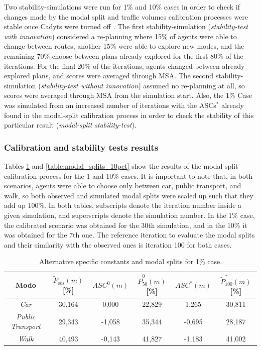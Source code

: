 \documentclass[Journal,letterpaper]{ascelike-new}
\begin{document}
Two stability-simulations were run for 1\% and 10\% cases in order to check if changes made by the modal split and traffic volumes calibration processes were stable once Cadyts were turned off . The first stability-simulation (\emph{stability-test with innovation}) considered a re-planning where 15\% of agents were able to change between routes, another 15\% were able to explore new modes, and the remaining 70\% choose between plans already explored for the first 80\% of the iterations. For the final 20\% of the iterations, agents changed between already explored plans, and scores were averaged through MSA. The second stability-simulation (\emph{stability-test without innovation}) assumed no re-planning at all, so scores were averaged through MSA from the simulation start. Also, the 1\% Case was simulated from an increased number of iterations with the ASCs$^{*}$ already found in the modal-split calibration process in order to check the stability of this particular result (\emph{modal-split stability-test}).
\subsubsection{Calibration and stability tests results}
Tables \ref{table:modal_splits_1pct} and \ref{table:modal_splits_10pct} show the results of the modal-split calibration process for the 1 and 10\% cases. It is important to note that, in both scenarios, agents were able to choose only between car, public transport, and walk, so both observed and simulated modal splits were scaled up such that they add up 100\%. In both tables, subscripts denote the iteration number inside a given simulation, and superscripts denote the simulation number. In the 1\% case, the calibrated scenario was obtained for the 30th simulation, and in the 10\% it was obtained for the 7th one. The reference iteration to evaluate the modal splits and their similarity with the observed ones is iteration 100 for both cases.

\begin{table}
\caption{Alternative specific constants and modal splits for 1\% case.}
\begin{tabular}{c|c|cc|cc}
\hline
Modo                      &$\tilde{P}_{obs}(m)$ [\%]& $ASC^{0}(m)$	& $\tilde{P}_{50}^{0}(m)$ [\%]	& $ASC^{*}(m)$& $\tilde{P}_{100}^{*}(m)$ [\%]\\
\hline
\emph{Car}             	  & 30,164 & 0,000 & 22,829 & 1,265  & 30,811 \\
\emph{Public Transport}   & 29,343 &-1,058 & 35,344 & -0,695 & 28,187 \\
\emph{Walk}               & 40,493 &-0,143 & 41,827 & -1,183 & 41,002 \\
\hline
\end{tabular}
\label{table:modal_splits_1pct}
\end{table}
\end{document}
